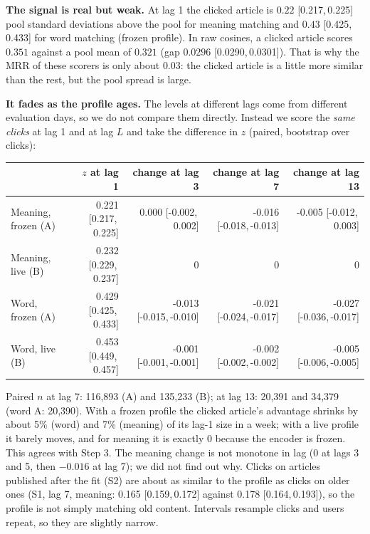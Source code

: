 \documentclass[11pt,a4paper]{article}
\newcommand{\ci}[2]{[#1,\,#2]}
\begin{document}
\textbf{The signal is real but weak.} At lag 1 the clicked article is $0.22$ \ci{0.217}{0.225} pool standard deviations above the pool for meaning matching and $0.43$ \ci{0.425}{0.433} for word matching (frozen profile). In raw cosines, a clicked article scores $0.351$ against a pool mean of $0.321$ (gap $0.0296$ \ci{0.0290}{0.0301}). That is why the MRR of these scorers is only about $0.03$: the clicked article is a little more similar than the rest, but the pool spread is large.

\textbf{It fades as the profile ages.} The levels at different lags come from different evaluation days, so we do not compare them directly. Instead we score the \emph{same clicks} at lag 1 and at lag $L$ and take the difference in $z$ (paired, bootstrap over clicks):
\begin{center}\small
\begin{tabular}{@{}lrrrr@{}}
\toprule
 & $z$ at lag 1 & change at lag 3 & change at lag 7 & change at lag 13\\
\midrule
Meaning, frozen (A) & 0.221 \ci{0.217}{0.225} & 0.000 \ci{-0.002}{0.002} & -0.016 \ci{-0.018}{-0.013} & -0.005 \ci{-0.012}{0.003}\\
Meaning, live (B) & 0.232 \ci{0.229}{0.237} & 0 & 0 & 0\\
Word, frozen (A) & 0.429 \ci{0.425}{0.433} & -0.013 \ci{-0.015}{-0.010} & -0.021 \ci{-0.024}{-0.017} & -0.027 \ci{-0.036}{-0.017}\\
Word, live (B) & 0.453 \ci{0.449}{0.457} & -0.001 \ci{-0.001}{-0.001} & -0.002 \ci{-0.002}{-0.002} & -0.005 \ci{-0.006}{-0.005}\\
\bottomrule
\end{tabular}
\end{center}
Paired $n$ at lag 7: 116,893 (A) and 135,233 (B); at lag 13: 20,391 and 34,379 (word A: 20,390). With a frozen profile the clicked article's advantage shrinks by about 5\% (word) and 7\% (meaning) of its lag-1 size in a week; with a live profile it barely moves, and for meaning it is exactly 0 because the encoder is frozen. This agrees with Step 3. The meaning change is not monotone in lag (0 at lags 3 and 5, then $-0.016$ at lag 7); we did not find out why. Clicks on articles published after the fit (S2) are about as similar to the profile as clicks on older ones (S1, lag 7, meaning: 0.165 \ci{0.159}{0.172} against 0.178 \ci{0.164}{0.193}), so the profile is not simply matching old content. Intervals resample clicks and users repeat, so they are slightly narrow.
\end{document}
